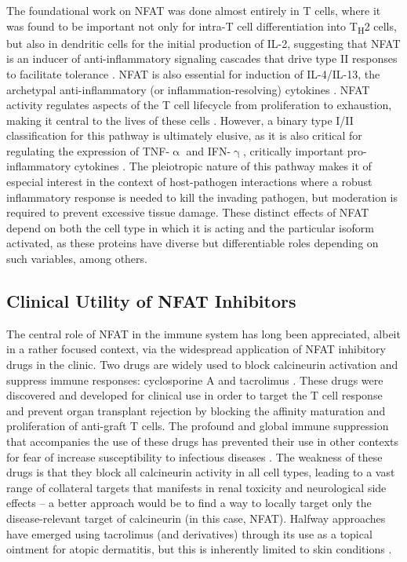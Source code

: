 The foundational work on NFAT was done almost entirely in T cells, where it was found to be important not only for intra\hyp{}T cell differentiation into T\textsubscript{H}2 cells, but also in dendritic cells for the initial production of IL\hyp{}2, suggesting that NFAT is an inducer of anti\hyp{}inflammatory signaling cascades that drive type II responses to facilitate tolerance \citep{Granucci2001, Granucci2003, Malek2004}. NFAT is also essential for induction of IL\hyp{}4/IL\hyp{}13, the archetypal anti\hyp{}inflammatory (or inflammation\hyp{}resolving) cytokines \citep{Monticelli2004, Agarwal2000, Monticelli2002, Wierenga2000}. NFAT activity regulates aspects of the T cell lifecycle from proliferation to exhaustion, making it central to the lives of these cells \citep{Crabtree2002, Martinez2015, Malek2004, Ranger1998a, YahiaCherbal2019}. However, a binary type I/II classification for this pathway is ultimately elusive, as it is also critical for regulating the expression of TNF\hyp{}$\upalpha$ and IFN\hyp{}$\upgamma$, critically important pro\hyp{}inflammatory cytokines \citep{Kiani2001, Sica1997, Kaminuma2008, Ke2006, Fric2012a, Nathan1983}. The pleiotropic nature of this pathway makes it of especial interest in the context of host\hyp{}pathogen interactions where a robust inflammatory response is needed to kill the invading pathogen, but moderation is required to prevent excessive tissue damage. These distinct effects of NFAT depend on both the cell type in which it is acting and the particular isoform activated, as these proteins have diverse but differentiable roles depending on such variables, among others.

\subsection{Clinical Utility of NFAT Inhibitors}\label{tacrolimus}

The central role of NFAT in the immune system has long been appreciated, albeit in a rather focused context, via the widespread application of NFAT inhibitory drugs in the clinic. Two drugs are widely used to block calcineurin activation and suppress immune responses: cyclosporine A and tacrolimus \citep{Mihatsch1998}. These drugs were discovered and developed for clinical use in order to target the T cell response and prevent organ transplant rejection by blocking the affinity maturation and proliferation of anti\hyp{}graft T cells. The profound and global immune suppression that accompanies the use of these drugs has prevented their use in other contexts for fear of increase susceptibility to infectious diseases \citep{vanSandwijk2013}. The weakness of these drugs is that they block all calcineurin activity in all cell types, leading to a vast range of collateral targets that manifests in renal toxicity and neurological side effects -- a better approach would be to find a way to locally target only the disease\hyp{}relevant target of calcineurin (in this case, NFAT). Halfway approaches have emerged using tacrolimus (and derivatives) through its use as a topical ointment for atopic dermatitis, but this is inherently limited to skin conditions \citep{Cheer2001, AlDaraji2002, Gupta2002, Gutfreund2013}. 

